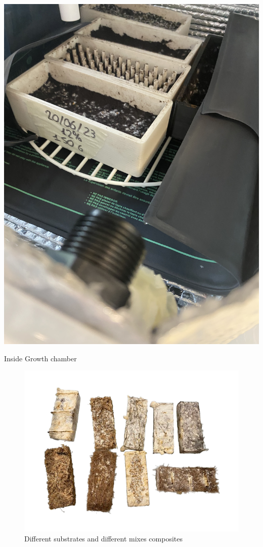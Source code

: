 \begin{marginfigure}
    \centering
    \includegraphics{images/IMG_3172.jpg}
    \caption{Inside Growth chamber}
    \label{fig:insidegrowth}
\end{marginfigure}

\begin{figure}[h]
    \centering
    \includegraphics{images/IMG_1790-removebg-preview.png}
    \caption{Different substrates and different mixes composites}
    \label{fig:diff2}
\end{figure} 


